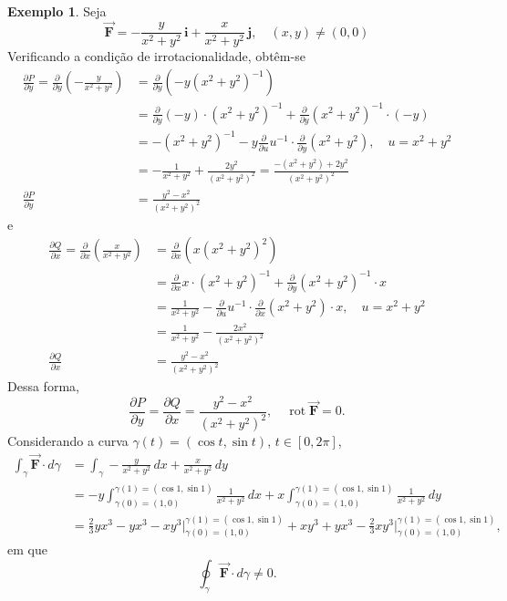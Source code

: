 \documentclass[11pt]{article}
\theoremstyle{definition}
\newtheorem{exemplo}{Exemplo}[subsection]
\begin{document}
\begin{exemplo}
		Seja
		\begin{equation*}
			\vec{\boldsymbol{F}}=-\frac{y}{x^2+y^2}\,\mathbf{i}+\frac{x}{x^2+y^2}\,\mathbf{j},\quad(x,y)\neq (0,0)
		\end{equation*}
		Verificando a condição de irrotacionalidade, obtêm-se
		\begin{align*}
			\frac{\partial P}{\partial y}=\frac{\partial}{\partial y}\left(-\frac{y}{x^2+y^2}\right)&=\frac{\partial}{\partial y}(-y(x^2+y^2)^{-1})\\
			&=\frac{\partial}{\partial y}(-y)\cdot(x^2+y^2)^{-1}+\frac{\partial}{\partial y}(x^2+y^2)^{-1}\cdot(-y)\\
			&=-(x^2+y^2)^{-1}-y\frac{\partial}{\partial u}u^{-1}\cdot \frac{\partial}{\partial y}(x^2+y^2),\quad u=x^2+y^2\\
			&=-\frac{1}{x^2+y^2}+\frac{2y^2}{(x^2+y^2)^2}=\frac{-(x^2+y^2)+2y^2}{(x^2+y^2)^2}\\
			\frac{\partial P}{\partial y}&=\frac{y^2-x^2}{(x^2+y^2)^2}
		\end{align*}
		e
		\begin{align*}
			\frac{\partial Q}{\partial x}=\frac{\partial}{\partial x}\left(\frac{x}{x^2+y^2}\right)&=\frac{\partial}{\partial x}(x(x^2+y^2)^2)\\
			&=\frac{\partial}{\partial x}x\cdot (x^2+y^2)^{-1}+\frac{\partial}{\partial y}(x^2+y^2)^{-1}\cdot x\\
			&=\frac{1}{x^2+y^2}-\frac{\partial}{\partial u}u^{-1}\cdot \frac{\partial}{\partial x}(x^2+y^2)\cdot x,\quad u=x^2+y^2\\
			&=\frac{1}{x^2+y^2}-\frac{2x^2}{(x^2+y^2)^2}\\
			\frac{\partial Q}{\partial x}&=\frac{y^2-x^2}{(x^2+y^2)^2}
		\end{align*}
		Dessa forma,
		\begin{equation*}
			\frac{\partial P}{\partial y}=\frac{\partial Q}{\partial x}=\frac{y^2-x^2}{(x^2+y^2)^2},\quad \operatorname{rot}\vec{\boldsymbol{F}}=0.
		\end{equation*}
		Considerando a curva $\gamma(t)=(\cos t,\sin t)$, $t\in [0,2\pi]$,
		\begin{align*}
			\int_{\gamma}\vec{\boldsymbol{F}}\cdot d\gamma&=\int_{\gamma}-\frac{y}{x^2+y^2}\,dx+\frac{x}{x^2+y^2}\,dy\\
			&=-y\int_{\gamma(0)=(1,0)}^{\gamma(1)=(\cos 1,\sin 1)}\frac{1}{x^2+y^2}\, dx+x\int_{\gamma(0)=(1,0)}^{\gamma(1)=(\cos 1,\sin 1)}\frac{1}{x^2+y^2}\,dy\\
			&=\frac{2}{3}yx^3-yx^3-xy^3\Big|_{\gamma(0)=(1,0)}^{\gamma(1)=(\cos 1,\sin 1)}+xy^3+yx^3-\frac{2}{3}xy^3\Big|_{\gamma(0)=(1,0)}^{\gamma(1)=(\cos 1,\sin 1)},
		\end{align*}
		em que
		\begin{equation*}
			\oint_{\gamma}\vec{\boldsymbol{F}}\cdot d\gamma\neq 0.
		\end{equation*}
	\end{exemplo}
	
\end{document}
